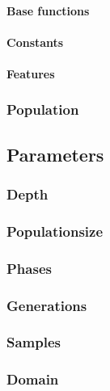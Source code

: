 \paragraph{Base functions}
\paragraph{Constants}
\paragraph{Features}
\subsubsection{Population}

\subsection{Parameters}
\subsubsection{Depth}
\subsubsection{Populationsize}
\subsubsection{Phases}
\subsubsection{Generations}

\subsubsection{Samples}

\subsubsection{Domain}

